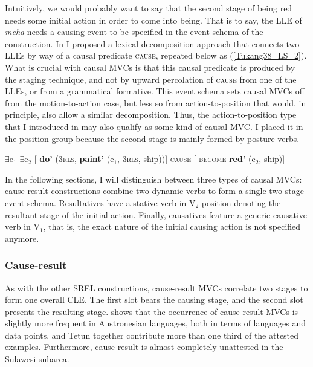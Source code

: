 Intuitively, we would probably want to say that the second stage of being red needs some initial action in order to come into being. That is to say, the LLE of \textit{meha} needs a causing event to be specified in the event schema of the construction. In  I proposed a lexical decomposition approach that connects two LLEs by way of a causal predicate \textsc{cause}, repeated below as (\ref{Tukang38_LS_2}). What is crucial with causal MVCs is that this causal predicate is produced by the staging technique, and not by upward percolation of \textsc{cause} from one of the LLEs, or from a grammatical formative. This event schema sets causal MVCs off from the motion-to-action case, but less so from action-to-position that would, in principle, also allow a similar decomposition. Thus, the action-to-position type that I introduced in  may also qualify as some kind of causal MVC. I placed it in the position group because the second stage is mainly formed by posture verbs.

\ea \label{Tukang38_LS_2} 
$\exists$e$_1$ $\exists$e$_2$ [ \textbf{do'} (3\textsc{rls}, \textbf{paint'} (e$_1$, 3\textsc{rls}, ship))] \textsc{cause} [ \textsc{become} \textbf{red'} (e$_2$, ship)]
\z

In the following sections, I will distinguish between three types of causal MVCs: cause-result constructions combine two dynamic verbs to form a single two-stage event schema. Resultatives have a stative verb in V$_2$ position denoting the resultant stage of the initial action. Finally, causatives feature a generic causative verb in V$_1$, that is, the exact nature of the initial causing action is not specified anymore.

\subsubsection{Cause-result} \label{sec:cause-result}

As with the other SREL constructions, cause-result MVCs correlate two stages to form one overall CLE. The first slot bears the causing stage, and the second slot presents the resulting stage.  shows that the occurrence of cause-result MVCs is slightly more frequent in Austronesian languages, both in terms of languages and data points.  and Tetun together contribute more than one third of the attested examples. Furthermore, cause-result is almost completely unattested in the Sulawesi subarea. 

